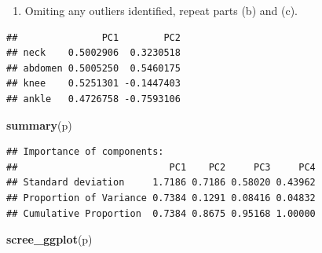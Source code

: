 \documentclass[]{article}
\newenvironment{Shaded}{\begin{snugshade}}{\end{snugshade}}
\newcommand{\DataTypeTok}[1]{\textcolor[rgb]{0.13,0.29,0.53}{#1}}
\newcommand{\DecValTok}[1]{\textcolor[rgb]{0.00,0.00,0.81}{#1}}
\newcommand{\KeywordTok}[1]{\textcolor[rgb]{0.13,0.29,0.53}{\textbf{#1}}}
\newcommand{\NormalTok}[1]{#1}
\newcommand{\OperatorTok}[1]{\textcolor[rgb]{0.81,0.36,0.00}{\textbf{#1}}}
\newcommand{\OtherTok}[1]{\textcolor[rgb]{0.56,0.35,0.01}{#1}}
\newcommand{\StringTok}[1]{\textcolor[rgb]{0.31,0.60,0.02}{#1}}
\providecommand{\tightlist}{%
  \setlength{\itemsep}{0pt}\setlength{\parskip}{0pt}}
\begin{document}
\begin{enumerate}
\def\labelenumi{(\alph{enumi})}
\setcounter{enumi}{3}
\tightlist
\item
  Omiting any outliers identified, repeat parts (b) and (c).
\end{enumerate}

\begin{Shaded}
\end{Shaded}

\begin{verbatim}
##               PC1        PC2
## neck    0.5002906  0.3230518
## abdomen 0.5005250  0.5460175
## knee    0.5251301 -0.1447403
## ankle   0.4726758 -0.7593106
\end{verbatim}

\begin{Shaded}
\begin{Highlighting}[]
\KeywordTok{summary}\NormalTok{(p)}
\end{Highlighting}
\end{Shaded}

\begin{verbatim}
## Importance of components:
##                           PC1    PC2     PC3     PC4
## Standard deviation     1.7186 0.7186 0.58020 0.43962
## Proportion of Variance 0.7384 0.1291 0.08416 0.04832
## Cumulative Proportion  0.7384 0.8675 0.95168 1.00000
\end{verbatim}

\begin{Shaded}
\begin{Highlighting}[]
\KeywordTok{scree_ggplot}\NormalTok{(p)}
\end{Highlighting}
\end{Shaded}
\end{document}
